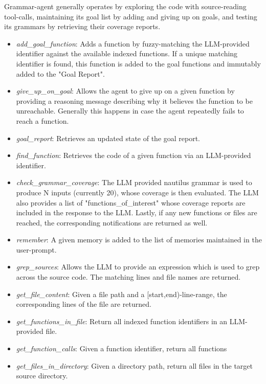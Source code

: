         Grammar-agent generally operates by exploring the code with source-reading tool-calls, maintaining its goal list by adding and giving up on goals, and testing its grammars by retrieving their coverage reports.
        
        \begin{itemize}
            \item \textit{add\_goal\_function}: Adds a function by fuzzy-matching the LLM-provided identifier against the available indexed functions. If a unique matching identifier is found, this function is added to the goal functions and immutably added to the "Goal Report".
            \item \textit{give\_up\_on\_goal}: Allows the agent to give up on a given function by providing a reasoning message describing why it believes the function to be unreachable. Generally this happens in case the agent repeatedly fails to reach a function.
            \item \textit{goal\_report}: Retrieves an updated state of the goal report.
            \item \textit{find\_function}: Retrieves the code of a given function via an LLM-provided identifier.
            \item \textit{check\_grammar\_coverage}: The LLM provided nautilus grammar is used to produce N inputs (currently 20), whose coverage is then evaluated. The LLM also provides a list of "functions\_of\_interest" whose coverage reports are included in the response to the LLM. Lastly, if any new functions or files are reached, the corresponding notifications are returned as well.
            \item \textit{remember}: A given memory is added to the list of memories maintained in the user-prompt.
            \item \textit{grep\_sources}: Allows the LLM to provide an expression which is used to grep across the source code. The matching lines and file names are returned.
            \item \textit{get\_file\_content}: Given a file path and a [start,end)-line-range, the corresponding lines of the file are returned.
            \item \textit{get\_functions\_in\_file}: Return all indexed function identifiers in an LLM-provided file.
            \item \textit{get\_function\_calls}: Given a function identifier, return all functions
            \item \textit{get\_files\_in\_directory}: Given a directory path, return all files in the target source directory.
        \end{itemize}

